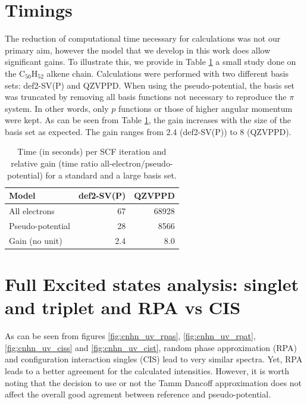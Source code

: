 \documentclass[aip]{revtex4-1}
\begin{document}
\section*{Timings}
The reduction of computational time necessary for calculations was not our primary aim, however the model that we develop in this work does allow significant gains.
To illustrate this, we provide in Table \ref{tab:time} a small study done on the C$_{50}$H$_{52}$
alkene chain.
Calculations were performed with two different basis sets: def2-SV(P) and QZVPPD.
When using the pseudo-potential, the basis set was truncated by removing all
basis functions not necessary to reproduce the
$\pi$ system.
In other words, only $p$ functions or those of higher angular momentum were kept.
As can be seen from Table \ref{tab:time}, the gain increases
with the size of the basis set as expected.
The gain ranges from 2.4 (def2-SV(P)) to 8 (QZVPPD).

\begin{table}[ht]
\begin{tabular}{lrr}
\hline\hline
Model            & def2-SV(P) & QZVPPD \\
\hline
All electrons    &        67 & 68928 \\
Pseudo-potential &        28 &  8566 \\
Gain (no unit)   &       2.4 &   8.0 \\
\hline\hline
\end{tabular}
\caption{\label{tab:time}Time (in seconds) per SCF iteration and relative
gain (time ratio all-electron/pseudo-potential) for a standard and a large basis set.} 
\end{table}

\section*{Full Excited states analysis: singlet and triplet and RPA vs CIS}
As can be seen from figures \ref{fig:cnhn_uv_rpas}, \ref{fig:cnhn_uv_rpat},
\ref{fig:cnhn_uv_ciss} and \ref{fig:cnhn_uv_cist}, random phase approximation (RPA)
and configuration interaction singles (CIS) lead to very similar spectra.
Yet, RPA leads to a better agreement for the calculated intensities.
However, it is worth noting that the decision to use or not the Tamm Dancoff approximation
does not affect the overall good agrement between reference and pseudo-potential.
\end{document}
